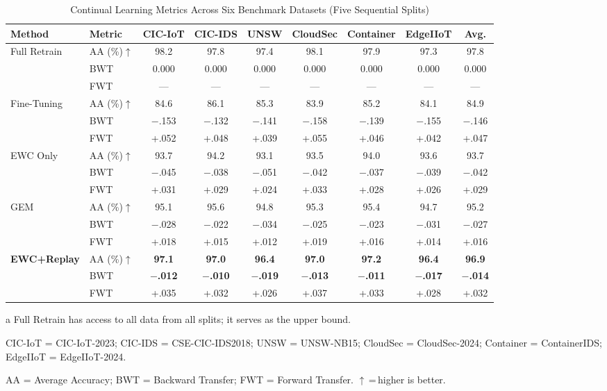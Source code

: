 \documentclass[journal]{IEEEtran}
\theoremstyle{definition}
\theoremstyle{remark}
\begin{document}
\begin{table}[!t]
\centering
\caption{Continual Learning Metrics Across Six Benchmark Datasets (Five Sequential Splits)}
\label{tab:cl_results}
\begin{threeparttable}
\begin{tabular}{@{}llccccccc@{}}
\toprule
\textbf{Method} & \textbf{Metric} & \textbf{CIC-IoT} & \textbf{CIC-IDS} & \textbf{UNSW} & \textbf{CloudSec} & \textbf{Container} & \textbf{EdgeIIoT} & \textbf{Avg.} \\
\midrule
\multirow{3}{*}{Full Retrain\tnote{a}} & AA (\%)$\uparrow$ & 98.2 & 97.8 & 97.4 & 98.1 & 97.9 & 97.3 & 97.8 \\
 & BWT & 0.000 & 0.000 & 0.000 & 0.000 & 0.000 & 0.000 & 0.000 \\
 & FWT & --- & --- & --- & --- & --- & --- & --- \\
\midrule
\multirow{3}{*}{Fine-Tuning} & AA (\%)$\uparrow$ & 84.6 & 86.1 & 85.3 & 83.9 & 85.2 & 84.1 & 84.9 \\
 & BWT & $-$.153 & $-$.132 & $-$.141 & $-$.158 & $-$.139 & $-$.155 & $-$.146 \\
 & FWT & +.052 & +.048 & +.039 & +.055 & +.046 & +.042 & +.047 \\
\midrule
\multirow{3}{*}{EWC Only} & AA (\%)$\uparrow$ & 93.7 & 94.2 & 93.1 & 93.5 & 94.0 & 93.6 & 93.7 \\
 & BWT & $-$.045 & $-$.038 & $-$.051 & $-$.042 & $-$.037 & $-$.039 & $-$.042 \\
 & FWT & +.031 & +.029 & +.024 & +.033 & +.028 & +.026 & +.029 \\
\midrule
\multirow{3}{*}{GEM} & AA (\%)$\uparrow$ & 95.1 & 95.6 & 94.8 & 95.3 & 95.4 & 94.7 & 95.2 \\
 & BWT & $-$.028 & $-$.022 & $-$.034 & $-$.025 & $-$.023 & $-$.031 & $-$.027 \\
 & FWT & +.018 & +.015 & +.012 & +.019 & +.016 & +.014 & +.016 \\
\midrule
\multirow{3}{*}{\textbf{EWC+Replay}} & AA (\%)$\uparrow$ & \textbf{97.1} & \textbf{97.0} & \textbf{96.4} & \textbf{97.0} & \textbf{97.2} & \textbf{96.4} & \textbf{96.9} \\
 & BWT & \textbf{$-$.012} & \textbf{$-$.010} & \textbf{$-$.019} & \textbf{$-$.013} & \textbf{$-$.011} & \textbf{$-$.017} & \textbf{$-$.014} \\
 & FWT & +.035 & +.032 & +.026 & +.037 & +.033 & +.028 & +.032 \\
\bottomrule
\end{tabular}
\begin{tablenotes}
\small
\item[a] Full Retrain has access to all data from all splits; it serves as the upper bound.
\item[] CIC-IoT = CIC-IoT-2023; CIC-IDS = CSE-CIC-IDS2018; UNSW = UNSW-NB15; CloudSec = CloudSec-2024; Container = ContainerIDS; EdgeIIoT = EdgeIIoT-2024.
\item[] AA = Average Accuracy; BWT = Backward Transfer; FWT = Forward Transfer. $\uparrow$\,=\,higher is better.
\end{tablenotes}
\end{threeparttable}
\end{table}
\end{document}
